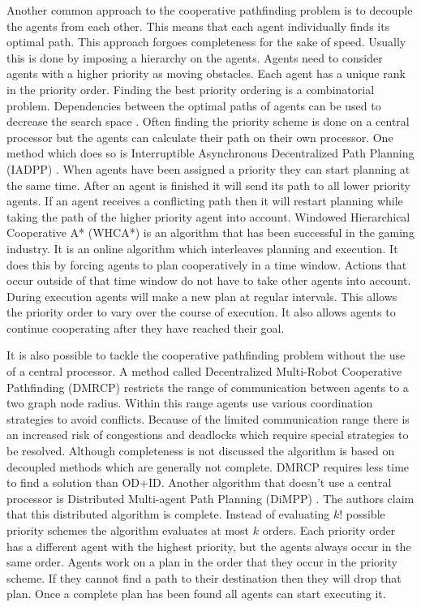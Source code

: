 Another common approach to the cooperative pathfinding problem is to decouple 
the agents from each other. This means that each agent individually finds its
optimal path. This approach forgoes completeness for the sake of speed. 
Usually this is done by imposing a hierarchy on the agents. Agents need to 
consider agents with a higher priority as moving obstacles. Each agent has a 
unique rank in the priority order. Finding the best priority ordering is a 
combinatorial problem. Dependencies between the optimal paths of agents can be
used to decrease the search space 
\cite{bennewitz2002}. Often finding the priority scheme is done on a central 
processor but the agents can calculate their path on their own processor. One 
method which does so is Interruptible Asynchronous Decentralized Path Planning 
(IADPP) \cite{cap2012}. When agents have been assigned a priority they can 
start planning at 
the same time. After an agent is finished it will send its path to all lower 
priority agents. If an agent receives a conflicting path then it will restart 
planning while taking the path of the higher priority 
agent into account. Windowed Hierarchical Cooperative A* (WHCA*) 
\cite{silver2005} is an algorithm that has been successful in the gaming 
industry. It is an online algorithm which interleaves planning and execution. 
It does this by forcing agents to plan cooperatively in a time window. Actions 
that occur outside of that time window do not have to take other agents into 
account. During execution agents will make a new plan at regular intervals. 
This allows the priority order to vary over the course of 
execution. It also allows agents to continue cooperating after they have 
reached their goal.

It is also possible to tackle the cooperative pathfinding problem without the 
use of a central processor. A method called Decentralized Multi-Robot 
Cooperative Pathfinding (DMRCP) \cite{wei2016} restricts the 
range of communication between agents to a two graph node radius. Within this 
range agents use various coordination strategies to avoid conflicts. Because of 
the limited communication range there is an increased risk of congestions and 
deadlocks which require special strategies to be resolved. Although 
completeness is not discussed the algorithm is based on decoupled methods which 
are generally not complete. DMRCP requires less time to find a solution than 
OD+ID. Another algorithm that doesn't use a central processor is Distributed 
Multi-agent Path Planning (DiMPP) \cite{chouhan2017}. The authors claim that 
this distributed algorithm is complete. Instead of evaluating 
$k!$ possible priority schemes the algorithm evaluates at most $k$ orders. Each 
priority order has a different agent with the highest priority, but the agents 
always occur in the same order. Agents work on a plan in the order that they 
occur in the priority scheme. If they cannot find a path to their destination 
then they will drop that plan. Once a complete plan has been found all agents 
can start executing it.

